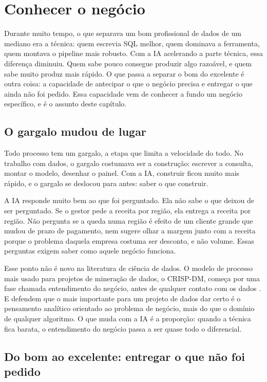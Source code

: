 \chapter{Conhecer o negócio}
\label{cap:negocio}

Durante muito tempo, o que separava um bom profissional de dados de um mediano era a
técnica: quem escrevia SQL melhor, quem dominava a ferramenta, quem montava o pipeline mais
robusto. Com a IA acelerando a parte técnica, essa diferença diminuiu. Quem sabe pouco
consegue produzir algo razoável, e quem sabe muito produz mais rápido. O que passa a
separar o bom do excelente é outra coisa: a capacidade de antecipar o que o negócio precisa
e entregar o que ainda não foi pedido. Essa capacidade vem de conhecer a fundo um negócio
específico, e é o assunto deste capítulo.

\section{O gargalo mudou de lugar}
\label{sec:gargalo}

Todo processo tem um gargalo, a etapa que limita a velocidade do todo. No trabalho com
dados, o gargalo costumava ser a construção: escrever a consulta, montar o modelo, desenhar
o painel. Com a IA, construir ficou muito mais rápido, e o gargalo se deslocou para antes:
saber o que construir.

A IA responde muito bem ao que foi perguntado. Ela não sabe o que deixou de ser perguntado.
Se o gestor pede a receita por região, ela entrega a receita por região. Não pergunta se a
queda numa região é efeito de um cliente grande que mudou de prazo de pagamento, nem
sugere olhar a margem junto com a receita porque o problema daquela empresa costuma ser
desconto, e não volume. Essas perguntas exigem saber como aquele negócio funciona.

Esse ponto não é novo na literatura de ciência de dados. O modelo de processo mais usado
para projetos de mineração de dados, o CRISP-DM, começa por uma fase chamada entendimento
do negócio, antes de qualquer contato com os dados \parencite{chapman2000}. E
\textcite{provost2013} defendem que o mais importante para um projeto de dados dar certo é
o pensamento analítico orientado ao problema de negócio, mais do que o domínio de qualquer
algoritmo. O que muda com a IA é a proporção: quando a técnica fica barata, o entendimento
do negócio passa a ser quase todo o diferencial.

\section{Do bom ao excelente: entregar o que não foi pedido}
\label{sec:bom-excelente}

